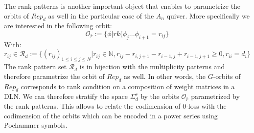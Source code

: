 \documentclass{article}
\theoremstyle{definition}
\begin{document}
The rank patterns is another important object that enables to parametrize the orbits of $Rep_d$ as well in the particular case of the $A_n$ quiver. More specifically we are interested in the following orbit:
\begin{equation*}
    \mathcal{O}_{\bar{r}}:=\{\phi|rk(\phi_j...\phi_{i+1}= r_{ij}\}
\end{equation*}
With:
\begin{equation*}
    r_{ij}\in\mathcal{R}_d:=\{(r_{ij})_{1\leq i \leq j \leq N}|r_{ij} \in\mathbb{N}, r_{ij} - r_{i,j+1} - r_{i-1,j} + r_{i-1,j+1} \geq 0, r_{ii} = d_i\}
\end{equation*}
The rank pattern set $\mathcal{R}_d$ is in bijection with the multiplicity patterns and therefore parametrize the orbit of $Rep_d$ as well. In other words, the $G$-orbits of $Rep_d$ corresponds to rank condition on a composition of weight matrices in a DLN. We can therefore stratify the space $\Sigma_d^r$ by the orbits $\mathcal{O}_{\bar{r}}$ parametrized by the rank patterns. This allows to relate the codimension of 0-loss with the codimension of the orbits which can be encoded in a power series using Pochammer symbols.
\end{document}
